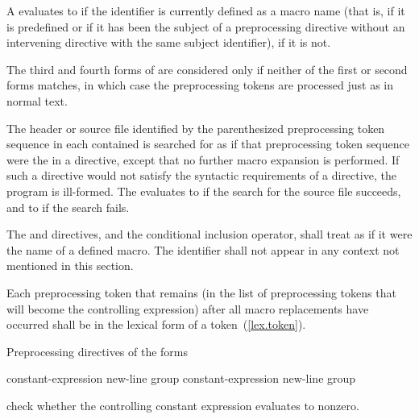 \pnum
A  evaluates to 
if the identifier is currently defined
as a macro name
(that is, if it is predefined
or if it has been the subject of a
preprocessing directive
without an intervening
directive with the same subject identifier),  if it is not.

\pnum
The third and fourth forms of 
are considered only if neither of the first or second forms matches,
in which case the preprocessing tokens are processed just as in normal text.

\pnum
The header or source file identified by
the parenthesized preprocessing token sequence
in each contained 
is searched for as if that preprocessing token sequence
were the  in a  directive,
except that no further macro expansion is performed.
If such a directive would not satisfy the syntactic requirements
of a  directive, the program is ill-formed.
The  evaluates
to  if the search for the source file succeeds, and
to  if the search fails.

\pnum
The  and  directives, and
the  conditional inclusion operator,
shall treat  as if it were the name of a defined macro.
The identifier  shall not appear
in any context not mentioned in this section.

\pnum
Each preprocessing token that remains (in the list of preprocessing tokens that
will become the controlling expression)
after all macro replacements have occurred
shall be in the lexical form of a token~(\ref{lex.token}).

\pnum
Preprocessing directives of the forms

\begin{ncbnftab}
%
\>\>constant-expression new-line group\opt\br
{}%
\>\>constant-expression new-line group\opt
\end{ncbnftab}

check whether the controlling constant expression evaluates to nonzero.

